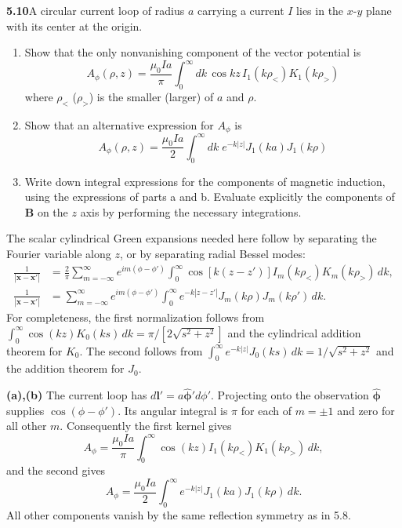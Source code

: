\par\bigskip
\noindent\textbf{5.10}\quad A circular current loop of radius $a$ carrying a current $I$ lies in the $x$-$y$ plane with its center at the origin.
\begin{enumerate}
\item[(a)] Show that the only nonvanishing component of the vector potential is
\[
A_{\phi}(\rho,z)=\frac{\mu_{0}Ia}{\pi}\int_{0}^{\infty}dk\,\cos kz\,I_{1}(k\rho_{<})K_{1}(k\rho_{>})
\]
where $\rho_{<}$ ($\rho_{>}$) is the smaller (larger) of $a$ and $\rho$.
\item[(b)] Show that an alternative expression for $A_{\phi}$ is
\[
A_{\phi}(\rho,z)=\frac{\mu_{0}Ia}{2}\int_{0}^{\infty}dk\;e^{-k|z|}J_{1}(ka)J_{1}(k\rho)
\]
\item[(c)] Write down integral expressions for the components of magnetic induction, using the expressions of parts a and b. Evaluate explicitly the components of $\mathbf{B}$ on the $z$ axis by performing the necessary integrations.
\end{enumerate}
\solution
The scalar cylindrical Green expansions needed here follow by
separating the Fourier variable along $z$, or by separating radial
Bessel modes:
\[
\begin{split}
\frac1{|\mathbf x-\mathbf x'|}
&=\frac2\pi\sum_{m=-\infty}^{\infty}e^{im(\phi-\phi')}
\int_0^\infty \cos[k(z-z')]I_m(k\rho_<)K_m(k\rho_>)\,dk,\\
\frac1{|\mathbf x-\mathbf x'|}
&=\sum_{m=-\infty}^{\infty}e^{im(\phi-\phi')}
\int_0^\infty e^{-k|z-z'|}J_m(k\rho)J_m(k\rho')\,dk.
\end{split}
\]
For completeness, the first normalization follows from
$\int_0^\infty\cos(kz)K_0(ks)\,dk=\pi/[2\sqrt{s^2+z^2}]$ and
the cylindrical addition theorem for $K_0$.
The second follows from
$\int_0^\infty e^{-k|z|}J_0(ks)\,dk=1/\sqrt{s^2+z^2}$
and the addition theorem for $J_0$.

\textbf{(a),(b)} The current loop has $d\mathbf l'=a\widehat{\boldsymbol\phi}'d\phi'$.
Projecting onto the observation $\widehat{\boldsymbol\phi}$ supplies
$\cos(\phi-\phi')$. Its angular integral is $\pi$ for each of $m=\pm1$
and zero for all other $m$. Consequently the first kernel gives
\[
\boxed{A_\phi=\frac{\mu_0Ia}{\pi}\int_0^\infty
\cos(kz)I_1(k\rho_<)K_1(k\rho_>)\,dk,}
\]
and the second gives
\[
\boxed{A_\phi=\frac{\mu_0Ia}{2}\int_0^\infty
e^{-k|z|}J_1(ka)J_1(k\rho)\,dk.}
\]
All other components vanish by the same reflection symmetry as in 5.8.


